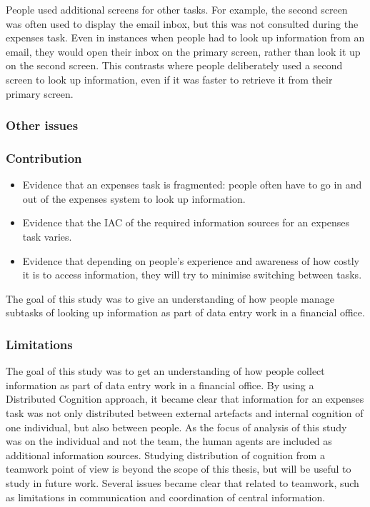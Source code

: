 People used additional screens for other tasks. For example, the second screen was often used to display the email inbox, but this was not consulted during the expenses task. Even in instances when people had to look up information from an email, they would open their inbox on the primary screen, rather than look it up on the second screen. This contrasts \citep{Grudin2001} where people deliberately used a second screen to look up information, even if it was  faster to retrieve it from their primary screen.


\subsubsection{Other issues}

\subsubsection{Contribution}
\begin{itemize}
\item
Evidence that an expenses task is fragmented: people often have to go in and out of the expenses system to look up information.    
\item
Evidence that the IAC of the required information sources for an expenses task varies. 
\item
Evidence that depending on people's experience and awareness of how costly it is to access information, they will try to minimise switching between tasks.
\end{itemize}

The goal of this study was to give an understanding of how people manage subtasks of looking up information as part of data entry work in a financial office.

\subsubsection{Limitations}
The goal of this study was to get an understanding of how people collect information as part of data entry work in a financial office. By using a Distributed Cognition approach, it became clear that information for an expenses task was not only distributed between external artefacts and internal cognition of one individual, but also between people. 
As the focus of analysis of this study was on the individual and not the team, the human agents are included as additional information sources. Studying distribution of cognition from a teamwork point of view is beyond the scope of this thesis, but will be useful to study in future work. Several issues became clear that related to teamwork, such as limitations in communication and coordination of central information. 

